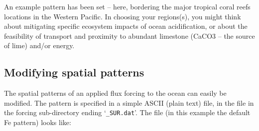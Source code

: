 \documentclass[11pt,fleqn]{book} %
\begin{document}
An example pattern has been set – here, bordering the major tropical coral reefs locations in the Western Pacific. In choosing your regions(s), you might think about mitigating specific ecosystem impacts of ocean acidification, or about the feasibility of transport and proximity to abundant limestone (CaCO3 – the source of lime) and/or energy.


\subsection{Modifying spatial patterns}

The spatial patterns of an applied flux forcing to the ocean can easily be modified. The pattern is specified in a simple ASCII (plain text) file, in the file in the forcing sub-directory ending ‘\texttt{\_SUR.dat}’. The file (in this example the default Fe pattern) looks like:

\newpage
\end{document}
